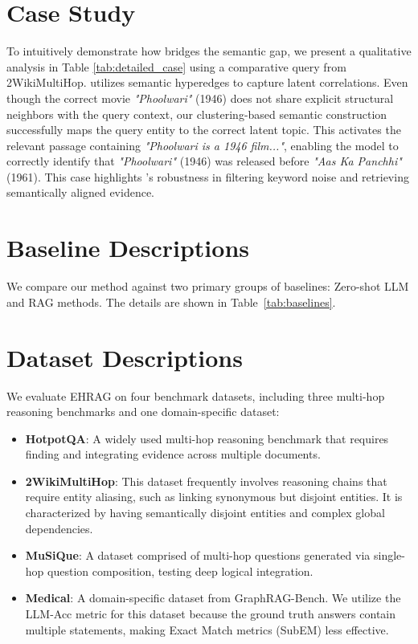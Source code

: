 \section{Case Study}
To intuitively demonstrate how \EHGRAG bridges the semantic gap, we present a qualitative analysis in Table \ref{tab:detailed_case} using a comparative query from 2WikiMultiHop. \EHGRAG utilizes semantic hyperedges to capture latent correlations. Even though the correct movie \textit{"Phoolwari"} (1946) does not share explicit structural neighbors with the query context, our clustering-based semantic construction successfully maps the query entity to the correct latent topic. This activates the relevant passage containing \textit{"Phoolwari is a 1946 film..."}, enabling the model to correctly identify that \textit{"Phoolwari"} (1946) was released before \textit{"Aas Ka Panchhi"} (1961). This case highlights \EHGRAG's robustness in filtering keyword noise and retrieving semantically aligned evidence.

\section{Baseline Descriptions}
We compare our method against two primary groups of baselines: Zero-shot LLM and RAG methods. The details are shown in Table~\ref{tab:baselines}.

\section{Dataset Descriptions}
\label{app:datasets}

We evaluate EHRAG on four benchmark datasets, including three multi-hop reasoning benchmarks and one domain-specific dataset:

\begin{itemize}[leftmargin=*]
    \item \textbf{HotpotQA}: A widely used multi-hop reasoning benchmark that requires finding and integrating evidence across multiple documents.
    \item \textbf{2WikiMultiHop}: This dataset frequently involves reasoning chains that require entity aliasing, such as linking synonymous but disjoint entities. It is characterized by having semantically disjoint entities and complex global dependencies.
    \item \textbf{MuSiQue}: A dataset comprised of multi-hop questions generated via single-hop question composition, testing deep logical integration.
    \item \textbf{Medical}: A domain-specific dataset from GraphRAG-Bench. We utilize the LLM-Acc metric for this dataset because the ground truth answers contain multiple statements, making Exact Match metrics (SubEM) less effective.
\end{itemize}


